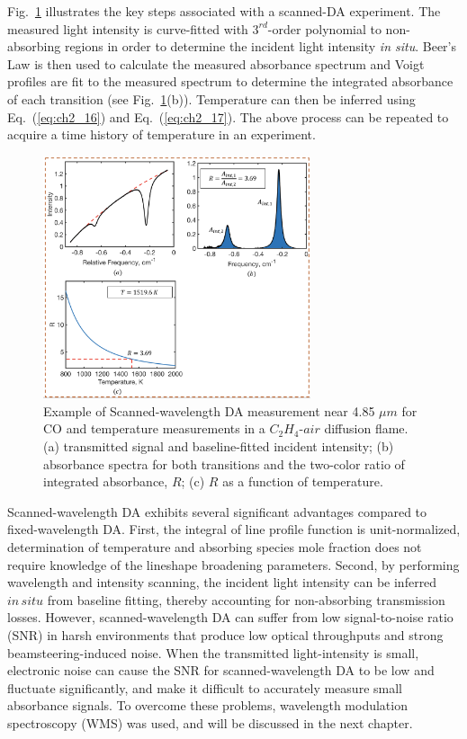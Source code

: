 Fig.\ \ref{fig:ch2_4} illustrates the key steps associated with a scanned-DA experiment. The measured light intensity is curve-fitted with $3^{rd}$-order polynomial to non-absorbing regions in order to determine the incident light intensity \textit{in situ}. Beer's Law is then used to calculate the measured absorbance spectrum and Voigt profiles are fit to the measured spectrum to determine the integrated absorbance of each transition (see Fig.\ \ref{fig:ch2_4}(b)). Temperature can then be inferred using Eq.\ (\ref{eq:ch2_16}) and Eq.\ (\ref{eq:ch2_17}). The above process can be repeated to acquire a time history of temperature in an experiment. 

\begin{figure}[h]
    \centering
        \includegraphics[width=0.7\textwidth]{fig/ch2_fig2_v3.png}
        \caption{Example of Scanned-wavelength DA measurement near 4.85 $\mu m$ for CO and temperature measurements in a $C_2H_4$-$air$ diffusion flame. (a) transmitted signal and baseline-fitted incident intensity; (b) absorbance spectra for both transitions and the two-color ratio of integrated absorbance, $R$; (c) $R$ as a function of temperature.}
    \label{fig:ch2_4}
\end{figure}


Scanned-wavelength DA exhibits several significant advantages compared to fixed-wavelength DA. First, the integral of line profile function is unit-normalized, determination of temperature and absorbing species mole fraction does not require knowledge of the lineshape broadening parameters. Second, by performing wavelength and intensity scanning, the incident light intensity can be inferred $in\,situ$ from baseline fitting, thereby accounting for non-absorbing transmission losses. However, scanned-wavelength DA can suffer from low signal-to-noise ratio (SNR) in harsh environments that produce low optical throughputs and strong beamsteering-induced noise. When the transmitted light-intensity is small, electronic noise can cause the SNR for scanned-wavelength DA to be low and fluctuate significantly, and make it difficult to accurately measure small absorbance signals. To overcome these problems, wavelength modulation spectroscopy (WMS) was used, and will be discussed in the next chapter.


